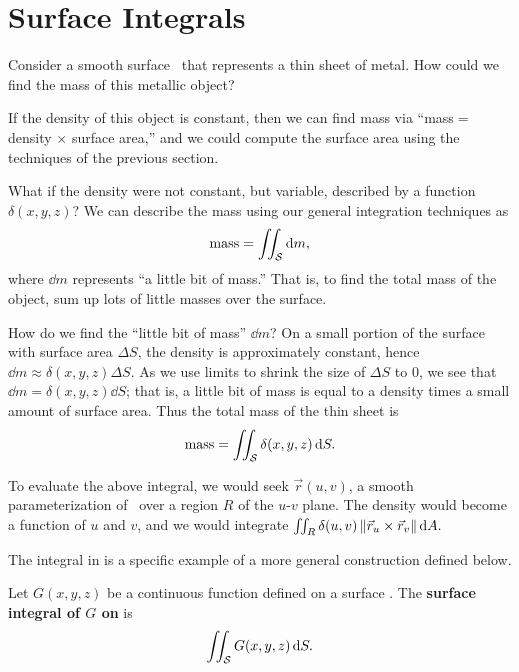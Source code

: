 \section{Surface Integrals}\label{sec:surface_integral}

Consider a smooth surface \surfaceS\ that represents a thin sheet of metal. How could we find the mass of this metallic object?

If the density of this object is constant, then we can find mass via ``mass$=$ density $\times$ surface area,'' and we could compute the surface area using the techniques of the previous section. 

What if the density were not constant, but variable, described by a function $\delta(x,y,z)$? We can describe the mass using our general integration techniques as
\[\text{mass} = \iint_{\mathcal{S}} \operatorname{d}\! m,\]
where $\dd m$ represents ``a little bit of mass.'' That is, to find the total mass of the object, sum up lots of little masses over the surface.

How do we find the ``little bit of mass'' $\dd m$? On a small portion of the surface with surface area $\Delta S$, the density is approximately constant, hence $\dd m \approx \delta(x,y,z)\Delta S$. As we use limits to shrink the size of $\Delta S$ to 0, we see that $\dd m = \delta(x,y,z)\dd S$; that is, a little bit of mass is equal to a density times a small amount of surface area. Thus the total mass of the thin sheet is
\begin{equation}
\text{mass} =\iint_{\mathcal{S}} \delta(x,y,z)\operatorname{d}\! S.\label{eq:surface_int}
\end{equation}

To evaluate the above integral, we would seek $\vec r(u,v)$, a smooth parameterization of \surfaceS\ over a region $R$ of the $u$-$v$ plane. The density would become a function of $u$ and $v$, and we would integrate $\iint_R \delta(u,v)\left\lVert \vec r_u\times \vec r_v \right\rVert\operatorname{d}\! A.$

The integral in  is a specific example of a more general construction defined below.

\begin{definition}\label{def:surface_integral}%
Let $G(x,y,z)$ be a continuous function defined on a surface \surfaceS. The \textbf{surface integral of $G$ on \surfaceS} is
\[\iint_{\mathcal{S}} G(x,y,z)\operatorname{d}\! S.\]
\end{definition}

